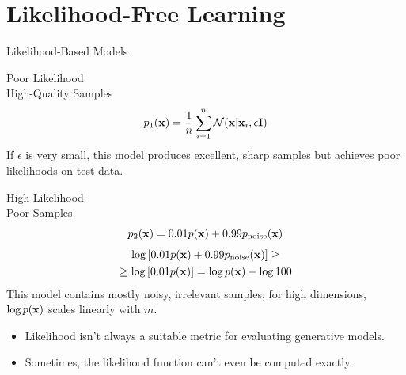 \documentclass{beamer}
\begin{document}
\section{Likelihood-Free Learning}
\begin{frame}{Likelihood-Based Models}
	\begin{minipage}[t]{0.48\columnwidth}
		\vspace{-0.3cm}
		\begin{block}{Poor Likelihood \\ High-Quality Samples}
			\vspace{-0.3cm}
			\[
				p_1(\mathbf{x}) = \frac{1}{n} \sum_{i=1}^n \mathcal{N}(\mathbf{x} | \mathbf{x}_i, \epsilon \mathbf{I})
			\]
			If $\epsilon$ is very small, this model produces excellent, sharp samples but achieves poor likelihoods on test data.
		\end{block}	
	\end{minipage}%
	\begin{minipage}[t]{0.52\columnwidth}
		\eqpause
		\vspace{-0.3cm}
		\begin{block}{High Likelihood \\ Poor Samples}
			\vspace{-0.5cm}
			\[
				p_2(\mathbf{x}) = 0.01p(\mathbf{x}) + 0.99p_{\text{noise}}(\mathbf{x})
			\]
			\vspace{-1.0cm}
			\begin{multline*}
				\log \left[ 0.01p(\mathbf{x}) + 0.99p_{\text{noise}}(\mathbf{x}) \right] \geq \\ \geq \log \left[ 0.01p(\mathbf{x}) \right]  = \log p(\mathbf{x}) - \log 100
			\end{multline*}
			This model contains mostly noisy, irrelevant samples; for high dimensions, $\log p(\mathbf{x})$ scales linearly with $m$.
		\end{block}
	\end{minipage}
	\eqpause
	\begin{itemize}
		\item Likelihood isn't always a suitable metric for evaluating generative models.
		\item Sometimes, the likelihood function can't even be computed exactly.
	\end{itemize}
\end{frame}
\end{document}
